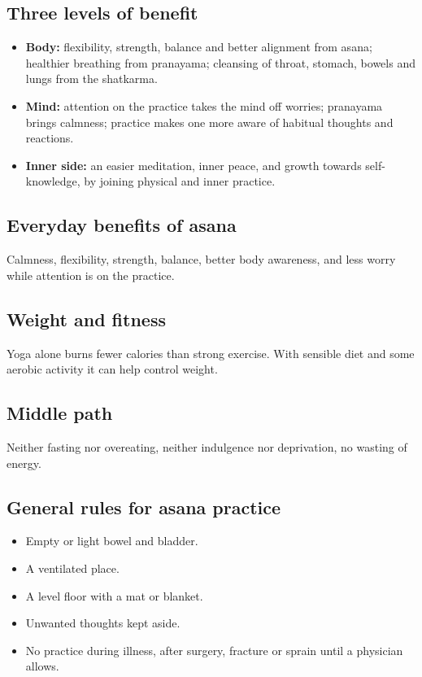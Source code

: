 \subsection*{Three levels of benefit}
\begin{itemize}
\item \textbf{Body:} flexibility, strength, balance and better alignment from asana; healthier breathing from pranayama; cleansing of throat, stomach, bowels and lungs from the shatkarma.
\item \textbf{Mind:} attention on the practice takes the mind off worries; pranayama brings calmness; practice makes one more aware of habitual thoughts and reactions.
\item \textbf{Inner side:} an easier meditation, inner peace, and growth towards self-knowledge, by joining physical and inner practice.
\end{itemize}

\subsection*{Everyday benefits of asana}
Calmness, flexibility, strength, balance, better body awareness, and less worry while attention is on the practice.

\subsection*{Weight and fitness}
Yoga alone burns fewer calories than strong exercise. With sensible diet and some aerobic activity it can help control weight.

\subsection*{Middle path}
Neither fasting nor overeating, neither indulgence nor deprivation, no wasting of energy.

\subsection*{General rules for asana practice}
\begin{itemize}
\item Empty or light bowel and bladder.
\item A ventilated place.
\item A level floor with a mat or blanket.
\item Unwanted thoughts kept aside.
\item No practice during illness, after surgery, fracture or sprain until a physician allows.
\end{itemize}

